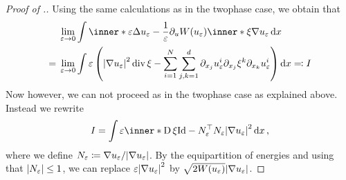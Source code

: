 \begin{proof}[Proof of .]
	Using the same calculations as in the twophase case, we obtain that
	\begin{align*}
		& \lim_{ \varepsilon \to 0 }
			\int
				\inner*{
					\varepsilon \Delta u_{ \varepsilon }
					-
					\frac{ 1 }{ \varepsilon } \partial_{ u } W ( u_{ \varepsilon } )
				}
				{
					\inner*{ \xi }{ \nabla u_{ \varepsilon } }
				}
			\dd{ x }
		\\
		={} &
		\lim_{ \varepsilon \to 0 }
			\int
				\varepsilon
				\left(
					\abs{ \nabla u_{ \varepsilon } }^{ 2 }
					\divg \xi 
					-
					\sum_{ i = 1 }^{ N }
						\sum_{ j, k = 1 }^{ d }
							\partial_{ x_{ j } } u_{ \varepsilon }^{ i }
							\partial_{ x_{ j } } \xi^{ k }
							\partial_{ x_{ k } } u_{ \varepsilon }^{ i }
				\right)
			\dd{ x } 
			\eqqcolon I
	\end{align*}
	Now however, we can not proceed as in the twophase case as explained above. 
	Instead we rewrite
	\begin{equation}
		\label{key_equality_for_ptw_estimate}
		I
		=
		\int
			\varepsilon
			\inner*{
				\diff \xi 
			}
			{
				\mathrm{Id} - N_{ \varepsilon }^{ \top } N_{ \varepsilon }
			}
			\abs{ \nabla u_{ \varepsilon } }^{ 2 }
		\dd{ x },
	\end{equation}
	where we define $ N_{ \varepsilon } \coloneqq \nabla u_{ \varepsilon } / \abs{ \nabla u_{ \varepsilon } } $. By the equipartition of energies  and using that $ \abs{N_{ \varepsilon } } \leq 1 $, we can replace $ \varepsilon \abs{ \nabla u_{ \varepsilon } }^{ 2 } $ by $ \sqrt{ 2 W ( u_{ \varepsilon } ) } \abs{ \nabla u_{ \varepsilon  } } $. 
	

\end{proof}
